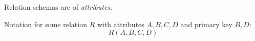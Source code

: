 
\begin{multicols}{2}






    \begin{CheatsheetEntryFrame}


        Relation schemas are  of \textit{attributes}.

        Notation for some relation $R$ with attributes $A, B, C, D$ and primary key $B, D$:
        \begin{equation*}
            R(A, \underline{B}, C, \underline{D})
        \end{equation*}


\end{CheatsheetEntryFrame}
\end{multicols}
